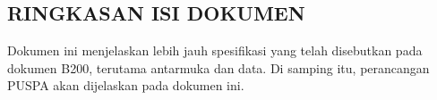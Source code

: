 \subsection*{\textcolor{subsectioncolor}{\textsf{RINGKASAN ISI DOKUMEN}}}

Dokumen ini menjelaskan lebih jauh spesifikasi yang telah disebutkan pada dokumen B200,
terutama antarmuka dan data.
Di samping itu, perancangan PUSPA akan dijelaskan pada dokumen ini.
